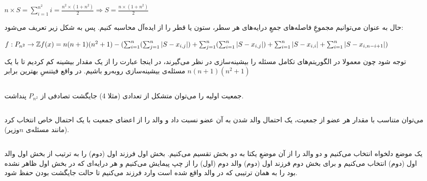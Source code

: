 \documentclass{article}
\begin{document}
\begin{latin}
$
n \times S = \sum_{i = 1}^{n^2}i = \frac{n^2 \times(1 + n^2)}{2}
\Longrightarrow
S = \frac{n \times(1 + n^2)}{2}
$
\end{latin}
حال به عنوان  می‌توانیم مجموعِ فاصله‌های جمعِ درایه‌های هر سطر، ستون یا قطر را از ایده‌آل محاسبه کنیم. پس   به شکل زیر تعریف می‌شود:

\begin{latin}
$
\newline
f: P_{n^2} \to \mathbb{Z}
\newline
f(x) =
n (n+1) (n^2 + 1)-
(   \sum_{i=1}^{n}(\sum_{j=1}^{n} \left| S - x_{i, j} \right|)
+ \sum_{j=1}^{n}(\sum_{i=1}^{n} \left| S - x_{i, j} \right|)
+ \sum_{i=1}^{n}\left| S - x_{i, i} \right|
+ \sum_{i=1}^{n}\left| S - x_{i, n-i+1} \right|)
$
\end{latin}
توجه شود چون معمولا در الگوریتم‌های تکامل مسئله را بیشینه‌سازی در نظر می‌گیرند، در اینجا عبارت را از یک مقدار بیشینه کم کردیم تا با یک مسئله‌ی بیشینه‌سازی رو‌به‌رو باشیم. در واقع فیتنسِ بهترین  برابر
$
n (n+1) (n^2 + 1)
$

\subsection{}
جمعیت اولیه را می‌توان متشکل از تعدادی (مثلا 4) جایگشت تصادفی از $P_{n^2}$ پنداشت.
\subsection{}
می‌توان متناسب با مقدار  هر عضو از جمعیت، یک احتمال والد شدن به آن عضو نسبت داد و والد را از اعضای جمعیت با یک احتمال خاص انتخاب کرد (مانند مسئله‌ی $n$وزیر).
\subsection{}
\subsubsection{}
یک موضع دلخواه انتخاب می‌کنیم و دو والد را از آن موضعِ یکتا به دو بخش تقسیم می‌کنیم. بخش اول فرزند اول (دوم) را به ترتیب از بخش اول والد اول (دوم) انتخاب می‌کنیم و برای بخش دوم فرزند اول (دوم) والد دوم (اول) را از چپ پیمایش می‌کنیم و هر درایه‌ای که در بخش اول ظاهر نشده بود را به همان ترتیبی که در والد واقع شده است وارد فرزند می‌کنیم تا حالت جایگشت بودن حفظ شود.
\end{document}
